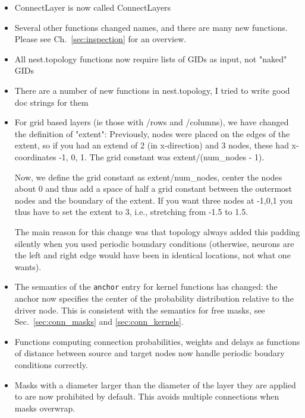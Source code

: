 \documentclass[a4paper,12pt]{report}
\begin{document}
\begin{itemize}
\item ConnectLayer is now called ConnectLayers
\item Several other functions changed names, and there are many new
  functions. Please see Ch.~\ref{sec:inspection} for an overview.
\item All nest.topology functions now require lists of GIDs as input,
  not "naked" GIDs
\item There are a number of new functions in nest.topology, I tried to
  write good doc strings for them
\item For grid based layers (ie those with /rows and /columns), we
  have changed the definition of "extent": Previously, nodes were
  placed on the edges of the extent, so if you had an extend of 2 (in
  x-direction) and 3 nodes, these had x-coordinates -1, 0, 1. The grid
  constant was extent/(num\_nodes - 1).

  Now, we define the grid constant as extent/num\_nodes, center the
  nodes about 0 and thus add a space of half a grid constant between
  the outermost nodes and the boundary of the extent. If you want
  three nodes at -1,0,1 you thus have to set the extent to 3, i.e.,
  stretching from -1.5 to 1.5.

  The main reason for this change was that topology always added this
  padding silently when you used periodic boundary conditions
  (otherwise, neurons are the left and right edge would have been in
  identical locations, not what one wants).
\item The semantics of the \lstinline!anchor! entry for kernel
  functions has changed: the anchor now specifies the center of the
  probability distribution relative to the driver node. This is
  consistent with the semantics for free masks, see
  Sec.~\ref{sec:conn_masks} and \ref{sec:conn_kernels}.
\item Functions computing connection probabilities, weights and delays
  as functions of distance between source and target nodes now handle
  periodic boudary conditions correctly.
\item Masks with a diameter larger than the diameter of the layer they
  are applied to are now prohibited by default. This avoids multiple
  connections when masks overwrap.
\end{itemize}






\listoffigures %
\listoftables  %

\printindex  
\end{document}
